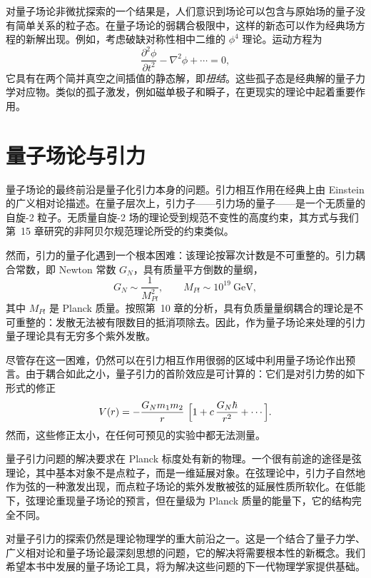对量子场论非微扰探索的一个结果是，人们意识到场论可以包含与原始场的量子没有简单关系的粒子态。在量子场论的弱耦合极限中，这样的新态可以作为经典场方程的新解出现。例如，考虑破缺对称性相中二维的 $\phi^4$ 理论。运动方程为
\begin{equation}
  \frac{\partial^2\phi}{\partial t^2} - \nabla^2\phi + \cdots = 0 ,
  \label{eq:22.18}
\end{equation}
它具有在两个简并真空之间插值的静态解，即\emph{扭结}。这些孤子态是经典解的量子力学对应物。类似的孤子激发，例如磁单极子和瞬子，在更现实的理论中起着重要作用。

\section{量子场论与引力}

量子场论的最终前沿是量子化引力本身的问题。引力相互作用在经典上由 Einstein 的广义相对论描述。在量子层次上，引力子——引力场的量子——是一个无质量的自旋-2 粒子。无质量自旋-2 场的理论受到规范不变性的高度约束，其方式与我们第~15 章研究的非阿贝尔规范理论所受的约束类似。

然而，引力的量子化遇到一个根本困难：该理论按幂次计数是不可重整的。引力耦合常数，即 Newton 常数 $G_N$，具有质量平方倒数的量纲，
\begin{equation}
  G_N \sim \frac{1}{M_{Pl}^2},
  \qquad M_{Pl} \sim 10^{19}\ \mathrm{GeV} ,
  \label{eq:22.19}
\end{equation}
其中 $M_{Pl}$ 是 Planck 质量。按照第~10 章的分析，具有负质量量纲耦合的理论是不可重整的：发散无法被有限数目的抵消项除去。因此，作为量子场论来处理的引力量子理论具有无穷多个紫外发散。

尽管存在这一困难，仍然可以在引力相互作用很弱的区域中利用量子场论作出预言。由于耦合如此之小，量子引力的首阶效应是可计算的：它们是对引力势的如下形式的修正
\begin{equation}
  V(r) = -\frac{G_N m_1 m_2}{r}\ \Bigl[ 1 + c\,
    \frac{G_N\hbar}{r^2} + \cdots \Bigr] .
  \label{eq:22.20}
\end{equation}
然而，这些修正太小，在任何可预见的实验中都无法测量。

量子引力问题的解决要求在 Planck 标度处有新的物理。一个很有前途的途径是弦理论，其中基本对象不是点粒子，而是一维延展对象。在弦理论中，引力子自然地作为弦的一种激发出现，而点粒子场论的紫外发散被弦的延展性质所软化。在低能下，弦理论重现量子场论的预言，但在量级为 Planck 质量的能量下，它的结构完全不同。

对量子引力的探索仍然是理论物理学的重大前沿之一。这是一个结合了量子力学、广义相对论和量子场论最深刻思想的问题，它的解决将需要根本性的新概念。我们希望本书中发展的量子场论工具，将为解决这些问题的下一代物理学家提供基础。


